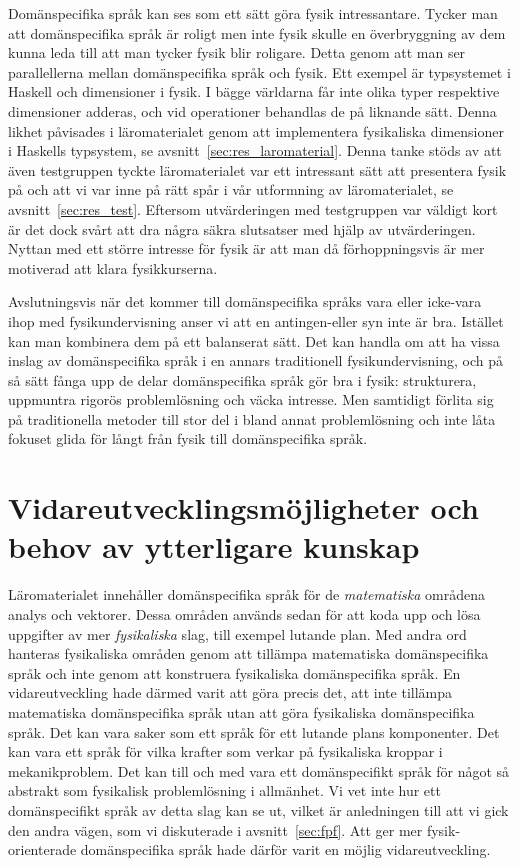 Domänspecifika språk kan ses som ett sätt göra fysik intressantare. Tycker man
att domänspecifika språk är roligt men inte fysik skulle en överbryggning av dem
kunna leda till att man tycker fysik blir roligare. Detta genom att man ser
parallellerna mellan domänspecifika språk och fysik. Ett exempel är typsystemet i
Haskell och dimensioner i fysik. I bägge världarna får inte olika typer
respektive dimensioner adderas, och vid operationer behandlas de på liknande
sätt. Denna likhet påvisades i läromaterialet genom att implementera fysikaliska
dimensioner i Haskells typsystem, se avsnitt~\ref{sec:res_laromaterial}. Denna
tanke stöds av att även testgruppen tyckte läromaterialet var ett intressant sätt
att presentera fysik på och att vi var inne på rätt spår i vår utformning av
läromaterialet, se avsnitt~\ref{sec:res_test}. Eftersom utvärderingen med
testgruppen var väldigt kort är det dock svårt att dra några säkra slutsatser
med hjälp av utvärderingen. Nyttan med ett större intresse för fysik är att man
då förhoppningsvis är mer motiverad att klara fysikkurserna.

Avslutningsvis när det kommer till domänspecifika språks vara eller icke-vara
ihop med fysikundervisning anser vi att en antingen-eller syn inte är bra.
Istället kan man kombinera dem på ett balanserat sätt. Det kan handla om att ha
vissa inslag av domänspecifika språk i en annars traditionell fysikundervisning,
och på så sätt fånga upp de delar domänspecifika språk gör bra i fysik:
strukturera, uppmuntra rigorös problemlösning och väcka intresse. Men samtidigt
förlita sig på traditionella metoder till stor del i bland annat problemlösning
och inte låta fokuset glida för långt från fysik till domänspecifika språk.

\section{Vidareutvecklingsmöjligheter och behov av ytterligare kunskap}

Läromaterialet innehåller domänspecifika språk för de \textit{matematiska}
områdena analys och vektorer. Dessa områden används sedan för att koda upp och
lösa uppgifter av mer \textit{fysikaliska} slag, till exempel lutande plan. Med andra ord hanteras fysikaliska områden genom att tillämpa matematiska domänspecifika språk och inte genom att konstruera fysikaliska domänspecifika språk. En vidareutveckling
hade därmed varit att göra precis det, att inte tillämpa matematiska
domänspecifika språk utan att göra fysikaliska domänspecifika språk. Det kan vara
saker som ett språk för ett lutande plans komponenter. Det kan vara ett
språk för vilka krafter som verkar på fysikaliska kroppar i mekanikproblem.
Det kan till och med vara ett domänspecifikt språk för något så abstrakt som
fysikalisk problemlösning i allmänhet. Vi vet inte hur ett domänspecifikt språk
av detta slag kan se ut, vilket är anledningen till att vi gick den andra vägen,
som vi diskuterade i avsnitt~\ref{sec:fpf}. Att ger mer fysik-orienterade
domänspecifika språk hade därför varit en möjlig vidareutveckling.

